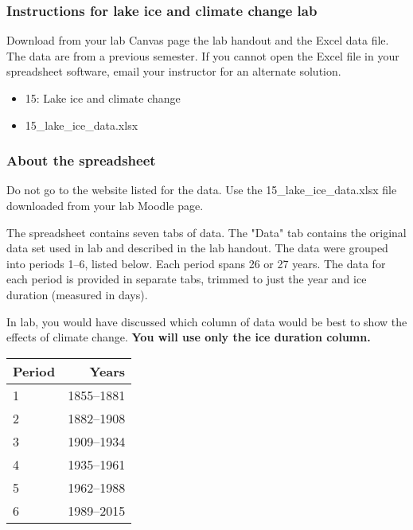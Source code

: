 \documentclass[12pt]{exam}
\begin{document}
\subsubsection*{Instructions for lake ice and climate change lab}


Download from your lab Canvas page the lab handout and the Excel data file. The data are from a previous semester. If you cannot open the Excel file in your spreadsheet software, email your instructor for an alternate solution.

\begin{itemize}
\item 15: Lake ice and climate change
\item 15\_lake\_ice\_data.xlsx
\end{itemize}

\subsubsection*{About the spreadsheet}

Do not go to the website listed for the data. 
Use the 15\_lake\_ice\_data.xlsx file downloaded from your lab Moodle page.

The spreadsheet contains seven tabs of data. The "Data" tab contains 
the original data set used in lab and described in the lab handout.  The data were  
grouped into periods 1–6, listed below. Each period spans 26 or 27 
years. The data for each period is provided in separate tabs, trimmed 
to just the year and ice duration (measured in days).

In lab, you would have discussed which column of data would be best
to show the effects of climate change. \textbf{You will use only 
the ice duration column.}

\begin{tabular}{lr}
\toprule
Period & Years \\
\midrule
1 & 1855–1881 \\
2 & 1882–1908 \\
3 & 1909–1934 \\
4 & 1935–1961 \\
5 & 1962–1988 \\
6 & 1989–2015 \\
\bottomrule
\end{tabular}
\end{document}
